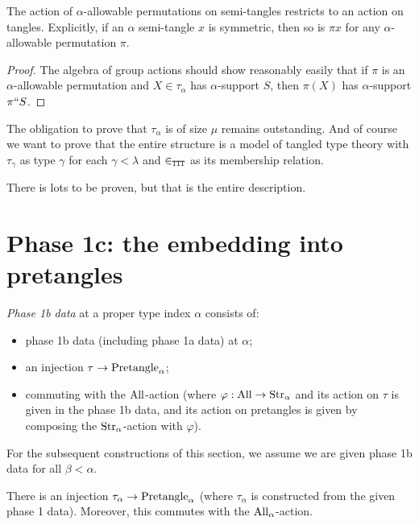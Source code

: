 \begin{lemma}
  \label{lem:tangle-action}
  The action of $\alpha$-allowable permutations on semi-tangles restricts to an action on tangles.  Explicitly, if an $\alpha$ semi-tangle $x$ is symmetric, then so is $\pi x$ for any $\alpha$-allowable permutation $\pi$.
\end{lemma}
\begin{proof}
  The algebra of group actions should show reasonably easily that if $\pi$ is an $\alpha$-allowable permutation and $X \in \tau_\alpha$ has $\alpha$-support $S$, then $\pi(X)$ has $\alpha$-support $\pi``S$.
\end{proof}

The obligation to prove that $\tau_\alpha$ is of size $\mu$ remains outstanding.  And of course we want to prove that the entire structure is a model of tangled type theory with $\tau_\gamma$ as type $\gamma$ for each $\gamma<\lambda$ and $\in_{\tt TTT}$ as its membership relation.

There is lots to be proven, but that is the entire description.

\section{Phase 1c: the embedding into pretangles}

\begin{definition}
  \label{def:phase-1c-data}
  \emph{Phase 1b data} at a proper type index $\alpha$ consists of:
  \begin{itemize}
  \item phase 1b data (including phase 1a data) at $\alpha$;
  \item an injection $\tau \to \mathrm{Pretangle}_\alpha$;
  \item commuting with the $\mathrm{All}$-action (where $\varphi : \mathrm{All} \to \mathrm{Str}_\alpha$ and its action on $\tau$ is given in the phase 1b data, and its action on pretangles is given by composing the $\mathrm{Str}_\alpha$-action with $\varphi$).
  \end{itemize}

  For the subsequent constructions of this section, we assume we are given phase 1b data for all $\beta < \alpha$.
\end{definition}

\begin{definition}
  \label{def:embedding-into-pretangles}
  There is an injection $\tau_\alpha \to \mathrm{Pretangle}_\alpha$ (where $\tau_\alpha$ is constructed from the given phase 1 data).  Moreover, this commutes with the $\mathrm{All}_\alpha$-action.
\end{definition}

